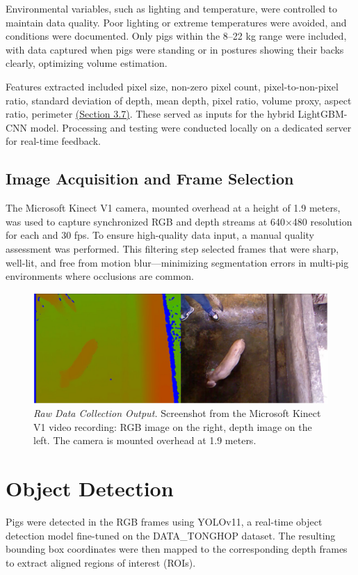 {Environmental variables, such as lighting and temperature, were controlled to maintain data quality. Poor lighting or extreme temperatures were avoided, and conditions were documented. Only pigs within the 8–22 kg range were included, with data captured when pigs were standing or in postures showing their backs clearly, optimizing volume estimation.

Features extracted included pixel size, non-zero pixel count, pixel-to-non-pixel ratio, standard deviation of depth, mean depth, pixel ratio, volume proxy, aspect ratio, perimeter \hyperref[Section 3.7]{(Section 3.7)}. These served as inputs for the hybrid LightGBM-CNN model. Processing and testing were conducted locally on a dedicated server for real-time feedback.

\subsection{Image Acquisition and Frame Selection}

The Microsoft Kinect V1 camera, mounted overhead at a height of 1.9 meters, was used to capture synchronized RGB and depth streams at 640$\times$480 resolution for each and 30 fps. To ensure high-quality data input, a manual quality assessment was performed. This filtering step selected frames that were sharp, well-lit, and free from motion blur—minimizing segmentation errors in multi-pig environments where occlusions are common.

\begin{figure}[h]
	\centering
	\includegraphics[height=0.25\textheight]{figures/Raw Data Collection}
	\caption{\textit{Raw Data Collection Output.} Screenshot from the Microsoft Kinect V1 video recording: RGB image on the right, depth image on the left. The camera is mounted overhead at 1.9 meters.}
	\label{fig:raw output}
\end{figure}

\newpage

\section{Object Detection}
Pigs were detected in the RGB frames using YOLOv11, a real-time object detection model fine-tuned on the DATA\_TONGHOP dataset\citep{khoi2024data_tonghop}. The resulting bounding box coordinates were then mapped to the corresponding depth frames to extract aligned regions of interest (ROIs).

}
